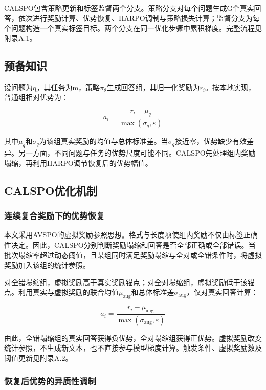 \documentclass[UTF8,a4paper,11pt,fontset=windows]{ctexart}
\begin{document}
CALSPO包含策略更新和标签监督两个分支。策略分支对每个问题生成G个真实回答，依次进行奖励计算、优势恢复、HARPO调制与策略损失计算；监督分支为每个问题构造一个真实标签目标。两个分支在同一优化步骤中累积梯度。完整流程见附录A.1。

\subsection{预备知识}

设问题为q，其任务为m，策略$\pi_\theta$生成回答组，其归一化奖励为$r_i$。按本地实现，普通组相对优势为：

\begin{equation}
a_i=\frac{r_i-\mu_q}{\max(\sigma_q,\varepsilon)}\label{eq:1}
\end{equation}

其中$\mu_q$和$\sigma_q$为该组真实奖励的均值与总体标准差。当$\sigma_q$接近零，优势缺少有效差异。另一方面，不同问题与任务的优势尺度可能不同。CALSPO先处理组内奖励塌缩，再利用HARPO调节恢复后的优势幅值。

\subsection{CALSPO优化机制}

\subsubsection{连续复合奖励下的优势恢复}

本文采用AVSPO的虚拟奖励参照思想\cite{ref9}。格式与长度项使组内奖励不仅由标签正确性决定。因此，CALSPO分别判断奖励塌缩和回答是否全部正确或全部错误。当批次塌缩率超过动态阈值，且某组同时满足奖励塌缩与全对或全错条件时，将虚拟奖励加入该组的统计参照。

对全错塌缩组，虚拟奖励高于真实奖励锚点；对全对塌缩组，虚拟奖励低于该锚点。利用真实与虚拟奖励的联合均值$\mu_{\mathrm{aug}}$和总体标准差$\sigma_{\mathrm{aug}}$，仅对真实回答计算：

\begin{equation}
a_i=\frac{r_i-\mu_{\mathrm{aug}}}{\max(\sigma_{\mathrm{aug}},\varepsilon)}\label{eq:2}
\end{equation}

由此，全错塌缩组的真实回答获得负优势，全对塌缩组获得正优势。虚拟奖励改变统计参照，不生成新文本，也不直接参与模型梯度计算。触发条件、虚拟奖励数及阈值更新见附录A.2。

\subsubsection{恢复后优势的异质性调制}
\end{document}

